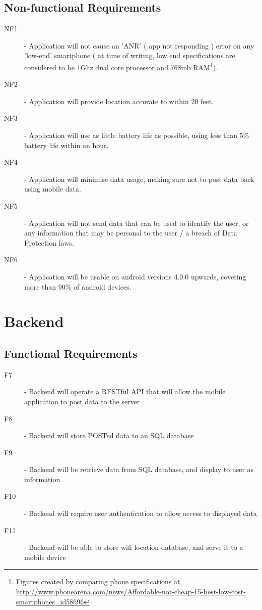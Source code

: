 \documentclass[11pt]{informatics-report}
\begin{document}
\subsection{Non-functional Requirements}
\begin{description}
\item[NF1] - Application will not cause an 'ANR' ( app not responding ) error on any 'low-end' smartphone ( at time of writing, low end specifications are considered to be 1Ghz dual core processor and 768mb RAM\footnote{Figures created by comparing phone specifications at \url{http://www.phonearena.com/news/Affordable-not-cheap-15-best-low-cost-smartphones_id58696}}).
\item[NF2] - Application will provide location accurate to within 20 feet.
\item[NF3] - Application will use as little battery life as possible, using less than 5\% battery life within an hour.
\item[NF4] - Application will minimise data usage, making sure not to post data back using mobile data.
\item[NF5] - Application will not send data that can be used to identify the user, or any information that may be personal to the user / a breach of Data Protection laws.
\item[NF6] - Application will be usable on android versions 4.0.0 upwards, covering more than 90\% of android devices\cite{androidstats}.
\end{description}

\section{Backend}
\subsection{Functional Requirements}
\begin{description}
\item[F7] - Backend will operate a RESTful API that will allow the mobile application to post data to the server
\item[F8] - Backend will store POSTed data to an SQL database
\item[F9] - Backend will be retrieve data from SQL database, and display to user as information
\item[F10] - Backend will require user authentication to allow access to displayed data
\item[F11] - Backend will be able to store wifi location database, and serve it to a mobile device
\end{description}
\end{document}
